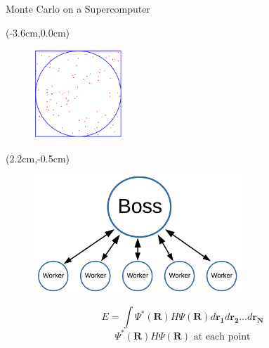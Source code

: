\documentclass{beamer}
\begin{document}
\begin{frame}{Monte Carlo on a Supercomputer}
\begin{textblock*}{\textwidth}(-3.6cm,0.0cm) %
\begin{figure}[h]
   \includegraphics[width=0.3\textwidth]{figures/circle_square_points.pdf}
\end{figure}
\end{textblock*}
\begin{textblock*}{\textwidth}(2.2cm,-0.5cm) %
\begin{figure}[h]
   \includegraphics[width=0.7\textwidth]{figures/boss_worker.png}
\end{figure}
\end{textblock*}
\vspace{4.0cm}
\begin{equation*}
   E = \int \Psi^*(\mathbf{R})H\Psi(\mathbf{R}) d\mathbf{r_1}d\mathbf{r_2}\ldots d\mathbf{r_N}
\end{equation*}
\begin{equation*}
   \Psi^*(\mathbf{R}) H \Psi(\mathbf{R}) \text{ at each point}
\end{equation*}
\end{frame}
\end{document}
